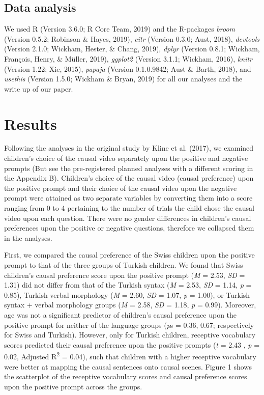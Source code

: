 \documentclass[man]{apa6}
\begin{document}
\subsection{Data analysis}\label{data-analysis}

We used R (Version 3.6.0; R Core Team, 2019) and the R-packages
\emph{broom} (Version 0.5.2; Robinson \& Hayes, 2019), \emph{citr}
(Version 0.3.0; Aust, 2018), \emph{devtools} (Version 2.1.0; Wickham,
Hester, \& Chang, 2019), \emph{dplyr} (Version 0.8.1; Wickham, François,
Henry, \& Müller, 2019), \emph{ggplot2} (Version 3.1.1; Wickham, 2016),
\emph{knitr} (Version 1.22; Xie, 2015), \emph{papaja} (Version
0.1.0.9842; Aust \& Barth, 2018), and \emph{usethis} (Version 1.5.0;
Wickham \& Bryan, 2019) for all our analyses and the write up of our
paper.

\section{Results}\label{results}

Following the analyses in the original study by Kline et al. (2017), we
examined children's choice of the causal video separately upon the
positive and negative prompts (But see the pre-registered planned
analyses with a different scoring in the Appendix B). Children's choice
of the causal video (causal preference) upon the positive prompt and
their choice of the causal video upon the negative prompt were attained
as two separate variables by converting them into a score ranging from 0
to 4 pertaining to the number of trials the child chose the causal video
upon each question. There were no gender differences in children's
causal preferences upon the positive or negative questions, therefore we
collapsed them in the analyses.

First, we compared the causal preference of the Swiss children upon the
positive prompt to that of the three groups of Turkish children. We
found that Swiss children's causal preference score upon the positive
prompt (\emph{M} = 2.53, \emph{SD} = 1.31) did not differ from that of
the Turkish syntax (\emph{M} = 2.53, \emph{SD} = 1.14, \emph{p} = 0.85),
Turkish verbal morphology (\emph{M} = 2.60, \emph{SD} = 1.07, \emph{p} =
1.00), or Turkish syntax + verbal morphology groups (\emph{M} = 2.58,
\emph{SD} = 1.18, \emph{p} = 0.99). Moreover, age was not a significant
predictor of children's causal preference upon the positive prompt for
neither of the language groups (\emph{p}s = 0.36, 0.67; respectively for
Swiss and Turkish). However, only for Turkish children, receptive
vocabulary scores predicted their causal preference upon the positive
prompts (\emph{t} = 2.43 , \emph{p} = 0.02, Adjusted
R\textsuperscript{2} = 0.04), such that children with a higher receptive
vocabulary were better at mapping the causal sentences onto causal
scenes. Figure 1 shows the scatterplot of the receptive vocabulary
scores and causal preference scores upon the positive prompt across the
groups.
\end{document}

